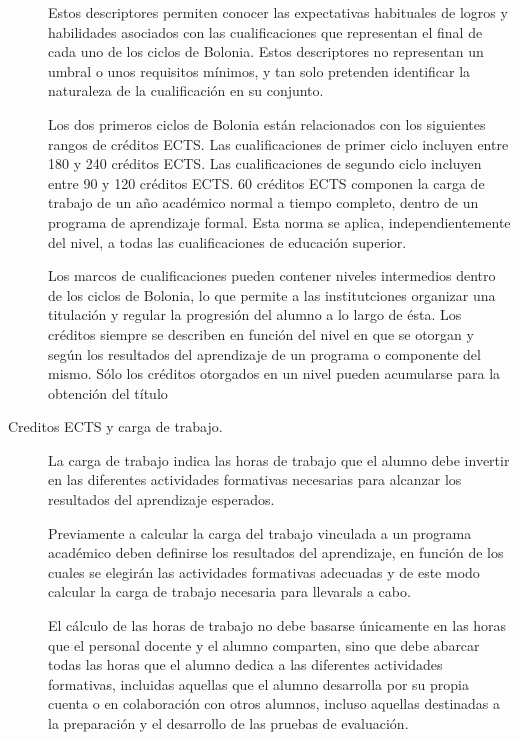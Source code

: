 \begin{description}
			Estos descriptores permiten conocer las expectativas habituales de logros y habilidades asociados con las cualificaciones que representan el final de cada uno de los ciclos de Bolonia. Estos descriptores no representan un umbral o unos requisitos mínimos, y tan solo pretenden identificar la naturaleza de la cualificación en su conjunto. 
				
			Los dos primeros ciclos de Bolonia están relacionados con los siguientes rangos de créditos ECTS. Las cualificaciones de primer ciclo incluyen entre 180 y 240 créditos ECTS. Las cualificaciones de segundo ciclo incluyen entre 90 y 120 créditos ECTS. 60 créditos ECTS componen la carga de trabajo de un año académico normal a tiempo completo, dentro de un programa de aprendizaje formal. Esta norma se aplica, independientemente del nivel, a todas las cualificaciones de educación superior.
				
			Los marcos de cualificaciones pueden contener niveles intermedios dentro de los ciclos de Bolonia, lo que permite a las institutciones organizar una titulación y regular la progresión del alumno a lo largo de ésta. Los créditos siempre se describen en función del nivel en que se otorgan y según los resultados del aprendizaje de un programa o componente del mismo. Sólo los créditos otorgados en un nivel pueden acumularse para la obtención del título 
				
			\item[Creditos ECTS y carga de trabajo.]La carga de trabajo indica las horas de trabajo que el alumno debe invertir en las diferentes actividades formativas necesarias para alcanzar los resultados del aprendizaje esperados.
				
			Previamente a calcular la carga del trabajo vinculada a un programa académico deben definirse los resultados del aprendizaje, en función de los cuales se elegirán las actividades formativas adecuadas y de este modo calcular la carga de trabajo necesaria para llevarals a cabo. 
				
			El cálculo de las horas de trabajo no debe basarse únicamente en las horas que el personal docente y el alumno comparten, sino que debe abarcar todas las horas que el alumno dedica a las diferentes actividades formativas, incluidas aquellas que el alumno desarrolla por su propia cuenta o en colaboración con otros alumnos, incluso aquellas destinadas a la preparación y el desarrollo de las pruebas de evaluación.
				
		\end{description}
 
